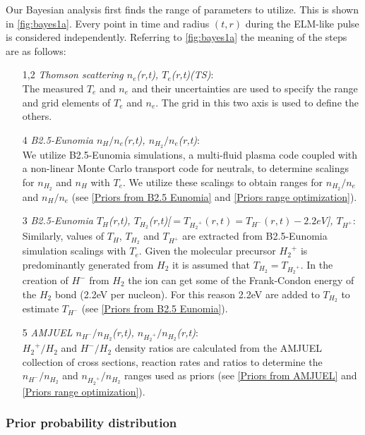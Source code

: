 Our Bayesian analysis first finds the range of parameters to utilize. This is shown in \autoref{fig:bayes1a}. Every point in time and radius $(t,r)$ during the ELM-like pulse is considered independently. Referring to \autoref{fig:bayes1a} the meaning of the steps are as follows:
\begin{enumerate}
    \item[1,2] \emph{Thomson scattering $n_e$(r,t), $T_e$(r,t)(TS)}: \\The measured $T_e$ and $n_e$ and their uncertainties are used to specify the range and grid elements of $T_e$ and $n_e$. The grid in this two axis is used to define the others.
    \item[4] \emph{B2.5-Eunomia $n_H/n_e$(r,t), $n_{H_2}/n_e$(r,t)}: \\ We utilize B2.5-Eunomia simulations, a multi-fluid plasma code coupled with a non-linear Monte Carlo transport code for neutrals\cite{Wieggers2013,Chandra2021,Chandra2022}, to determine scalings for $n_{H_2}$ and $n_H$ with $T_e$. We utilize these scalings to obtain ranges for $n_{H_2}/n_e$ and $n_H/n_e$ (see \autoref{Priors from B2.5 Eunomia} and \ref{Priors range optimization}).
    \item[3] \emph{B2.5-Eunomia $T_H$(r,t), $T_{H_2}$(r,t)[$=T_{{H_2}^+}(r,t)=T_{H^-}(r,t)-2.2eV$], $T_{H^+}$}: \\Similarly, values of $T_H$, $T_{H_2}$ and $T_{H^+}$ are extracted from B2.5-Eunomia simulation scalings with $T_e$. Given the molecular precursor ${H_2}^+$ is predominantly generated from $H_2$ it is assumed that $T_{H_2}=T_{{H_2}^+}$. In the creation of $H^-$ from $H_2$ the ion can get some of the Frank-Condon energy of the $H_2$ bond (2.2eV per nucleon). For this reason 2.2eV are added to $T_{H_2}$ to estimate $T_{H^-}$\cite{Verhaegh2020} (see \autoref{Priors from B2.5 Eunomia}).
    \item[5] \emph{AMJUEL $n_{H^-}/n_{H_2}$(r,t), $n_{{H_2}^+}/n_{H_2}$(r,t)}: \\${H_2}^+/H_2$ and $H^-/H_2$ density ratios are calculated from the AMJUEL collection of cross sections, reaction rates and ratios \cite{Reiter2017,Reiter2005,Kotov2007} to determine the $n_{H^-}/n_{H_2}$ and $n_{{H_2}^+}/n_{H_2}$ ranges used as priors (see \autoref{Priors from AMJUEL} and \ref{Priors range optimization}).
\end{enumerate}

\subsubsection{Prior probability distribution}\label{Prior probability distribution}

